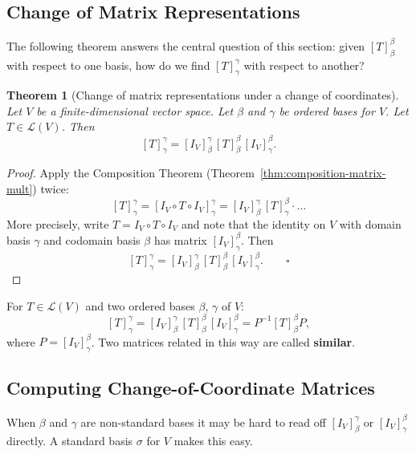 \documentclass[11pt, a4paper, notitlepage]{report}
\newtheorem{theorem}{Theorem}[section]
\theoremstyle{definition}
\theoremstyle{remark}
\begin{document}
\subsection{Change of Matrix Representations}

The following theorem answers the central question of this section: given $[T]_\beta^\beta$
with respect to one basis, how do we find $[T]_\gamma^\gamma$ with respect to another?

\begin{theorem}[Change of matrix representations under a change of coordinates]
\label{thm:change-of-matrix-rep}
Let $V$ be a finite-dimensional vector space.  Let $\beta$ and $\gamma$ be ordered bases
for $V$.  Let $T \in \mathcal{L}(V)$.  Then
\[
  [T]_\gamma^\gamma = [I_V]_\beta^\gamma\,[T]_\beta^\beta\,[I_V]_\gamma^\beta.
\]
\end{theorem}

\begin{proof}
Apply the Composition Theorem (Theorem~\ref{thm:composition-matrix-mult}) twice:
\[
  [T]_\gamma^\gamma
  = [I_V \circ T \circ I_V]_\gamma^\gamma
  = [I_V]_\beta^\gamma\,[T]_\gamma^\beta \cdot \ldots
\]
More precisely, write $T = I_V \circ T \circ I_V$ and note that the identity on $V$ with
domain basis $\gamma$ and codomain basis $\beta$ has matrix $[I_V]_\gamma^\beta$.  Then
\[
  [T]_\gamma^\gamma
  = [I_V]_\beta^\gamma\,[T]_\beta^\beta\,[I_V]_\gamma^\beta. \qquad \square
\]
\end{proof}

\begin{keyresult}[title={Key Result: Changing Basis for an Operator}]
For $T \in \mathcal{L}(V)$ and two ordered bases $\beta$, $\gamma$ of $V$:
\[
  [T]_\gamma^\gamma = [I_V]_\beta^\gamma\,[T]_\beta^\beta\,[I_V]_\gamma^\beta
  = P^{-1}[T]_\beta^\beta P,
\]
where $P = [I_V]_\gamma^\beta$.  Two matrices related in this way are called
\textbf{similar}.
\end{keyresult}

\subsection{Computing Change-of-Coordinate Matrices}

When $\beta$ and $\gamma$ are non-standard bases it may be hard to read off $[I_V]_\beta^\gamma$
or $[I_V]_\gamma^\beta$ directly.  A standard basis $\sigma$ for $V$ makes this easy.
\end{document}
